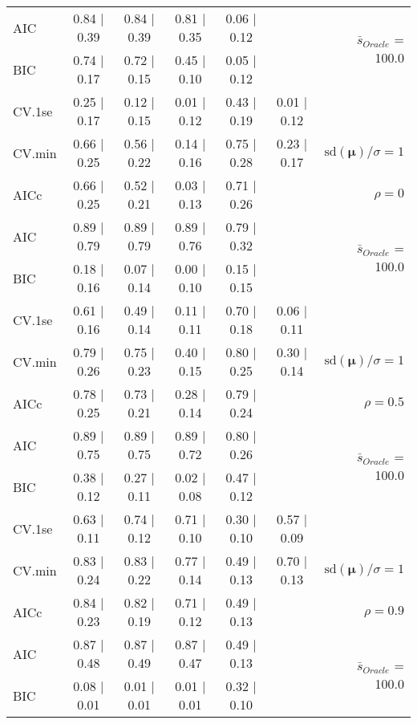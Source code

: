 \begin{table}
\begin{center}
\begin{tabular}{l*{5}{c}|r}
AIC & 0.84 $\mid$ 0.39 & 0.84 $\mid$ 0.39 & 0.81 $\mid$ 0.35 & 0.06 $\mid$ 0.12 & &  \multirow{2}{*}{$\bar{s}_{Oracle}$ = 100.0} \\
BIC & 0.74 $\mid$ 0.17 & 0.72 $\mid$ 0.15 & 0.45 $\mid$ 0.10 & 0.05 $\mid$ 0.12 & &  \\
 \hline 
CV.1se & 0.25 $\mid$ 0.17 & 0.12 $\mid$ 0.15 & 0.01 $\mid$ 0.12 & 0.43 $\mid$ 0.19 & 0.01 $\mid$ 0.12 & \\
CV.min & 0.66 $\mid$ 0.25 & 0.56 $\mid$ 0.22 & 0.14 $\mid$ 0.16 & 0.75 $\mid$ 0.28 & 0.23 $\mid$ 0.17 &  $\mathrm{sd}(\mathbf{\mu})/\sigma=1$ \\
AICc & 0.66 $\mid$ 0.25 & 0.52 $\mid$ 0.21 & 0.03 $\mid$ 0.13 & 0.71 $\mid$ 0.26 & & $\rho=0$ \\
AIC & 0.89 $\mid$ 0.79 & 0.89 $\mid$ 0.79 & 0.89 $\mid$ 0.76 & 0.79 $\mid$ 0.32 & &  \multirow{2}{*}{$\bar{s}_{Oracle}$ = 100.0} \\
BIC & 0.18 $\mid$ 0.16 & 0.07 $\mid$ 0.14 & 0.00 $\mid$ 0.10 & 0.15 $\mid$ 0.15 & &  \\
 \hline 
CV.1se & 0.61 $\mid$ 0.16 & 0.49 $\mid$ 0.14 & 0.11 $\mid$ 0.11 & 0.70 $\mid$ 0.18 & 0.06 $\mid$ 0.11 & \\
CV.min & 0.79 $\mid$ 0.26 & 0.75 $\mid$ 0.23 & 0.40 $\mid$ 0.15 & 0.80 $\mid$ 0.25 & 0.30 $\mid$ 0.14 &  $\mathrm{sd}(\mathbf{\mu})/\sigma=1$ \\
AICc & 0.78 $\mid$ 0.25 & 0.73 $\mid$ 0.21 & 0.28 $\mid$ 0.14 & 0.79 $\mid$ 0.24 & & $\rho=0.5$ \\
AIC & 0.89 $\mid$ 0.75 & 0.89 $\mid$ 0.75 & 0.89 $\mid$ 0.72 & 0.80 $\mid$ 0.26 & &  \multirow{2}{*}{$\bar{s}_{Oracle}$ = 100.0} \\
BIC & 0.38 $\mid$ 0.12 & 0.27 $\mid$ 0.11 & 0.02 $\mid$ 0.08 & 0.47 $\mid$ 0.12 & &  \\
 \hline 
CV.1se & 0.63 $\mid$ 0.11 & 0.74 $\mid$ 0.12 & 0.71 $\mid$ 0.10 & 0.30 $\mid$ 0.10 & 0.57 $\mid$ 0.09 & \\
CV.min & 0.83 $\mid$ 0.24 & 0.83 $\mid$ 0.22 & 0.77 $\mid$ 0.14 & 0.49 $\mid$ 0.13 & 0.70 $\mid$ 0.13 &  $\mathrm{sd}(\mathbf{\mu})/\sigma=1$ \\
AICc & 0.84 $\mid$ 0.23 & 0.82 $\mid$ 0.19 & 0.71 $\mid$ 0.12 & 0.49 $\mid$ 0.13 & & $\rho=0.9$ \\
AIC & 0.87 $\mid$ 0.48 & 0.87 $\mid$ 0.49 & 0.87 $\mid$ 0.47 & 0.49 $\mid$ 0.13 & &  \multirow{2}{*}{$\bar{s}_{Oracle}$ = 100.0} \\
BIC & 0.08 $\mid$ 0.01 & 0.01 $\mid$ 0.01 & 0.01 $\mid$ 0.01 & 0.32 $\mid$ 0.10 & &  \\

\end{tabular}
\end{center}
\end{table}
